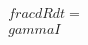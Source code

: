 \documentclass[preview]{standalone}
\begin{document}
\begin{align*}
\quad\\frac{dR}{dt} = \quad\\gamma I
\end{align*}
\end{document}
